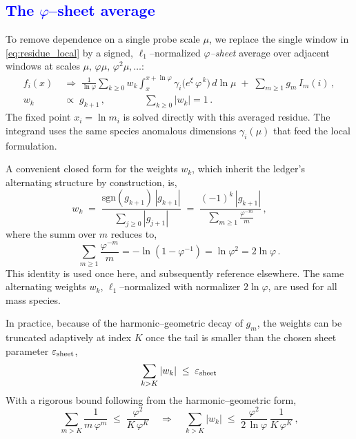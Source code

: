 \documentclass[%
 amsmath,amssymb,
 aps,
prb,
floatfix, showkeys
]{revtex4-2}
\newcommand{\modif}[1]{\textcolor{blue}{#1}}
\begin{document}
  {\modif{
\subsection{  The $\varphi$--sheet average} 
\label{subsec:phi-sheet}
  }}
To remove dependence on a single probe scale $\mu$, we replace the single window
in \eqref{eq:residue_local} by a signed, $\ell_1$–normalized \emph{$\varphi$–sheet} average
over adjacent windows at scales $\mu,\,\varphi\mu,\,\varphi^2\mu,\dots$:
\begin{align}
  f_i(x)
  &\;\Rightarrow\; \frac{1}{\ln\varphi} \sum_{k\ge 0} w_k \int_{x}^{x+\ln\varphi}\!
     \gamma_i\!\big(e^{\xi}\,\varphi^{\,k}\big)\,d\ln\mu \;+\; \sum_{m\ge 1} g_m\,I_m(i)\,,
  \label{eq:sheet_residue}\\[2pt]
  w_k &\;\propto\; g_{k+1}\,,\qquad     %
  \qquad \sum_{k\ge 0} |w_k|=1\,.
\end{align}
The fixed point $x_i=\ln m_i$ is solved directly with this averaged residue.
The integrand uses the same species anomalous dimensions $\gamma_i(\mu)$ that feed the
local formulation.

A convenient closed form for the weights $w_k$, which inherit the ledger’s alternating structure by construction, is,
\begin{equation}
  w_k \;=\; \frac{\mathrm{sgn}(g_{k+1})\,|g_{k+1}|}{\sum_{j\ge 0} |g_{j+1}|}
  \;=\; \frac{(-1)^k\,|g_{k+1}|}{\displaystyle \sum_{m\ge 1} \frac{\varphi^{-m}}{m}}\,,\qquad
  \label{eq:wk_closed_form}
\end{equation}
where the summ over $m$ reduces to, 
\begin{equation}
  \sum_{m\ge 1} \frac{\varphi^{-m}}{m} = -\ln(1-\varphi^{-1}) = \ln \varphi^2   = 2\ln\varphi\,.
  \label{eq:wk_closed_form_1}
\end{equation}
This identity is used once here, and subsequently reference elsewhere.
The same alternating weights $w_k$,   $\ell_1$–normalized with normalizer $2\ln\varphi$,
are used for all mass species.

In practice, because of the harmonic–geometric decay of $g_m$, 
the weights can be truncated adaptively at index $K$ once the tail is smaller than
the chosen sheet parameter  $\varepsilon_{\rm sheet}$,
\begin{equation}
  \sum_{k>K} |w_k| \;\le\; \varepsilon_{\rm sheet}  %
  \label{eq:sheet_tail_boun}
\end{equation}
With a rigorous bound following from the harmonic–geometric form, 
\begin{equation}
 \sum_{m>K}\frac{1}{m\,\varphi^m}
\;\le\; \frac{\varphi^2}{K\,\varphi^{K}}
\quad\Rightarrow\quad
 \sum_{k>K} |w_k| \;\le\; \frac{\varphi^{2}}{2\,\ln\varphi}\,\frac{1}{K\,\varphi^{K}}\,,
  \label{eq:sheet_tail_bound}
\end{equation}
\end{document}
